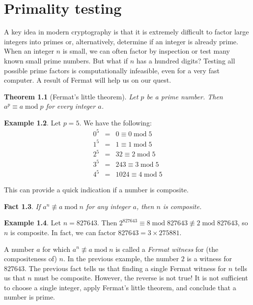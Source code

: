 \documentclass{book}
\theoremstyle{plain}
\newtheorem{theorem}{Theorem}[chapter]
\newtheorem{fact}[theorem]{Fact}
\theoremstyle{definition}
\newtheorem{example}[theorem]{Example}
\renewcommand{\mod}{\operatorname{mod}}
\renewcommand{\mod}{\operatorname{mod}}
\begin{document}
\chapter{Primality testing}
A key idea in modern cryptography is that it is extremely difficult to factor large integers into primes or, alternatively, determine if an integer is already prime. When an integer $n$ is small, we can often factor by inspection or test many known small prime numbers. But what if $n$ has a hundred digits? Testing all possible prime factors is computationally infeasible, even for a very fast computer. A result of Fermat will help us on our quest.
\begin{theorem}[Fermat's little theorem]
Let $p$ be a prime number. Then $a^p \equiv a \mod p$ for every integer $a$.
\end{theorem}

\begin{example}
Let $p = 5$. We have the following:
\begin{eqnarray*}
0^5 &=&  0 \equiv 0 \mod 5 \\
1^5 &=& 1 \equiv 1 \mod 5 \\
2^5 &=& 32 \equiv 2 \mod 5 \\
3^5 &=& 243 \equiv 3 \mod 5 \\
4^5 &=& 1024 \equiv 4 \mod 5
\end{eqnarray*}
\end{example}

This can provide a quick indication if a number is composite.

\begin{fact}
If $a^n \not\equiv a \mod n$ for any integer $a$, then $n$ is composite.
\end{fact}

\begin{example}
Let $n = 827643$. Then $2^{827643} \equiv 8 \mod 827643 \not\equiv 2 \mod 827643$, so $n$ is composite. In fact, we can factor $827643 = 3 \times 275881$.
\end{example}

A number $a$ for which $a^n \not\equiv a \mod n$ is called a {\it Fermat witness} for (the compositeness of) $n$. In the previous example, the number $2$ is a witness for $827643$. The previous fact tells us that finding a single Fermat witness for $n$ tells us that $n$ must be composite. However, the reverse is not true! It is not sufficient to choose a single integer, apply Fermat's little theorem, and conclude that a number is prime.
\end{document}
